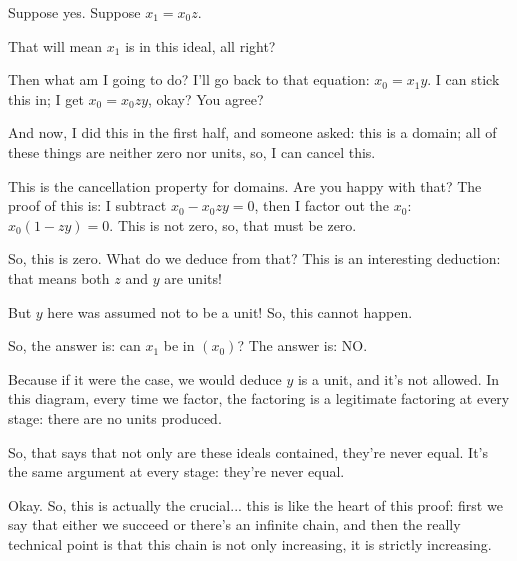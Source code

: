 \begin{proofWrapper}
\begin{content}
\end{content}

\begin{speech}[01:07:11 - 01:09:39]
Suppose yes. Suppose $x_1 = x_0 z$. 

That will mean $x_1$ is in this ideal, all right?

Then what am I going to do? I'll go back to that equation: $x_0 = x_1 y$.  I can stick this in; I get $x_0 = x_0 z y$,  okay? You agree?

And now, I did this in the first half, and someone asked: this is a domain; all of these things are neither zero nor units, so, I can cancel this. 

This is the cancellation property for domains. Are you happy with that? The proof of this is: I subtract $x_0 - x_0 z y = 0$, then I factor out the $x_0$: $x_0(1 - z y) = 0$. This is not zero, so, that must be zero. 

So, this is zero. What do we deduce from that? This is an interesting deduction: that means both $z$ and $y$ are units! 

But $y$ here was assumed not to be a unit! So, this cannot happen.

So, the answer is: can $x_1$ be in $(x_0)$? The answer is: NO. 

Because if it were the case, we would deduce $y$ is a unit, and it's not allowed. In this diagram, every time we factor, the factoring is a legitimate factoring at every stage: there are no units produced.

So, that says that not only are these ideals contained, they're never equal. It's the same argument at every stage: they're never equal.

Okay. So, this is actually the crucial... this is like the heart of this proof: first we say that either we succeed or there's an infinite chain, and then the really technical point is that this chain is not only increasing, it is strictly increasing.


\end{speech}
\end{proofWrapper}
